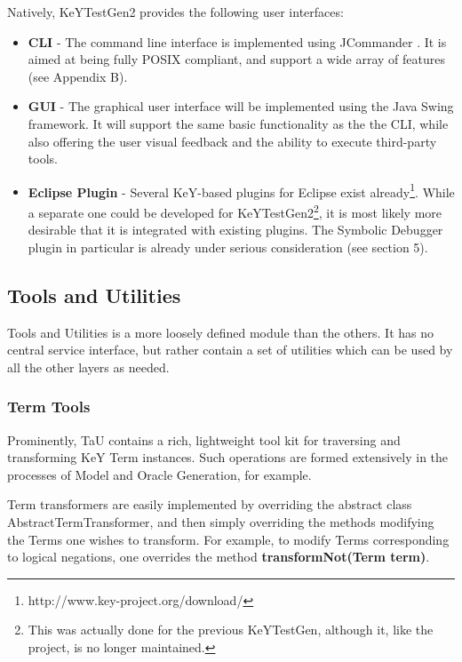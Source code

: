\documentclass{article}
\newcommand{\tmstrong}[1]{\textbf{#1}}
\newenvironment{itemizedot}{\begin{itemize} \renewcommand{\labelitemi}{$\bullet$}\renewcommand{\labelitemii}{$\bullet$}\renewcommand{\labelitemiii}{$\bullet$}\renewcommand{\labelitemiv}{$\bullet$}}{\end{itemize}}
\begin{document}
Natively, KeYTestGen2 provides the following user interfaces:
\begin{itemizedot}
  \item {\tmstrong{CLI}} - The command line interface is implemented using
  JCommander {\cite{JCommanderWebsite}}. It is aimed at being fully POSIX
  compliant, and support a wide array of features (see Appendix B).
  
  \item {\tmstrong{GUI}} - The graphical user interface will be implemented
  using the Java Swing framework. It will support the same basic functionality
  as the the CLI, while also offering the user visual feedback and the ability
  to execute third-party tools.
  
  \item {\tmstrong{Eclipse Plugin}} - Several KeY-based plugins for Eclipse
  exist already{\footnote{http://www.key-project.org/download/}}. While a
  separate one could be developed for KeYTestGen2{\footnote{This was actually
  done for the previous KeYTestGen, although it, like the project, is no
  longer maintained.}}, it is most likely more desirable that it is integrated
  with existing plugins. The Symbolic Debugger plugin in particular is already
  under serious consideration (see section 5).
\end{itemizedot}

\subsection{Tools and Utilities}

Tools and Utilities is a more loosely defined module than the others. It has
no central service interface, but rather contain a set of utilities which can
be used by all the other layers as needed.



\subsubsection{Term Tools}

Prominently, TaU contains a rich, lightweight tool kit for traversing and
transforming KeY Term instances. Such operations are formed extensively in the
processes of Model and Oracle Generation, for example.



Term transformers are easily implemented by overriding the abstract class
AbstractTermTransformer, and then simply overriding the methods modifying the
Terms one wishes to transform. For example, to modify Terms corresponding to
logical negations, one overrides the method {\tmstrong{transformNot(Term
term)}}.
\end{document}
